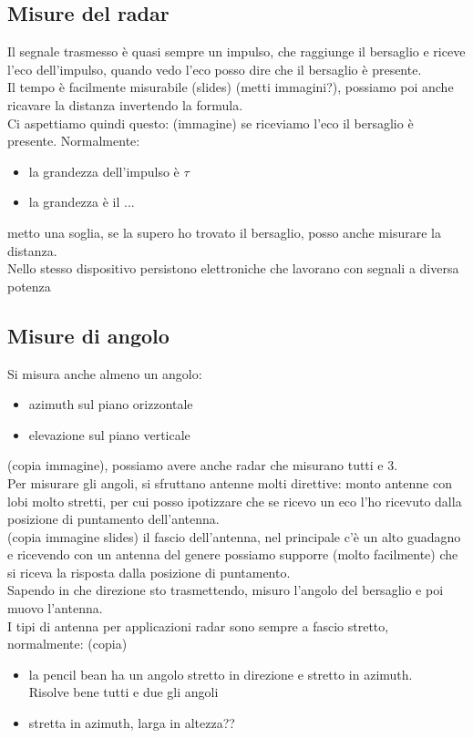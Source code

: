 \documentclass[oneside, 12pt]{extbook}
\begin{document}
\subsection{Misure del radar}
Il segnale trasmesso è quasi sempre un impulso, che raggiunge il bersaglio e riceve l'eco dell'impulso, quando vedo l'eco posso dire che il bersaglio è presente.\\
Il tempo è facilmente misurabile (slides) (metti immagini?), possiamo poi anche ricavare la distanza invertendo la formula.\\
Ci aspettiamo quindi questo: (immagine) se riceviamo l'eco il bersaglio è presente. Normalmente:
\begin{itemize}
	\item la grandezza dell'impulso è $\tau$
	\item la grandezza è il ...
\end{itemize}
metto una soglia, se la supero ho trovato il bersaglio, posso anche misurare la distanza.\\
Nello stesso dispositivo persistono elettroniche che lavorano con segnali a diversa potenza

\subsection{Misure di angolo}
Si misura anche almeno un angolo:
\begin{itemize}
	\item azimuth sul piano orizzontale
	\item elevazione sul piano verticale
\end{itemize}
(copia immagine), possiamo avere anche radar che misurano tutti e 3.\\
Per misurare gli angoli, si sfruttano antenne molti direttive: monto antenne con lobi molto stretti, per cui posso ipotizzare che se ricevo un eco l'ho ricevuto dalla posizione di puntamento dell'antenna.\\
(copia immagine slides)
il fascio dell'antenna, nel principale c'è un alto guadagno e ricevendo con un antenna del genere possiamo supporre (molto facilmente) che si riceva la risposta dalla posizione di puntamento.\\
Sapendo in che direzione sto trasmettendo, misuro l'angolo del bersaglio e poi muovo l'antenna.\\
I tipi di antenna per applicazioni radar sono sempre a fascio stretto, normalmente:
(copia)

\begin{itemize}
	\item la pencil bean ha un angolo stretto in direzione e stretto in azimuth.\\Risolve bene tutti e due gli angoli
	\item stretta in azimuth, larga in altezza??
\end{itemize}
\end{document}
